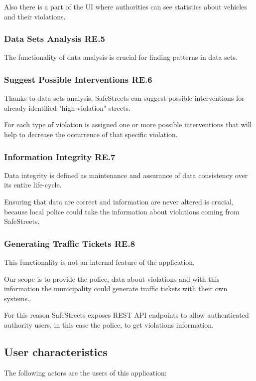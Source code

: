 Also there is a part of the UI where authorities can see statistics about vehicles and their violations.

\subsubsection{Data Sets Analysis RE.5}
The functionality of data analysis is crucial for finding patterns in data sets.

\subsubsection{Suggest Possible Interventions RE.6}
Thanks to data sets analysis, SafeStreets can suggest possible interventions for already identified "high-violation" streets.

For each type of violation is assigned one or more possible interventions that will help to decrease the occurrence of that specific violation.


\subsubsection{Information Integrity RE.7}
Data integrity is defined as maintenance and assurance of data consistency over its entire life-cycle.

Ensuring that data are correct and information are never altered is crucial, because local police could take the information about violations coming from SafeStreets.

\subsubsection{Generating Traffic Tickets RE.8}
This functionality is not an internal feature of the application. 

Our scope is to provide the police, data about violations and with this information the municipality could generate traffic tickets with their own systems..

For this reason SafeStreets exposes REST API endpoints to allow authenticated authority users, in this case the police, to get violations information.


\subsection{User characteristics}

The following actors are the users of this application:

